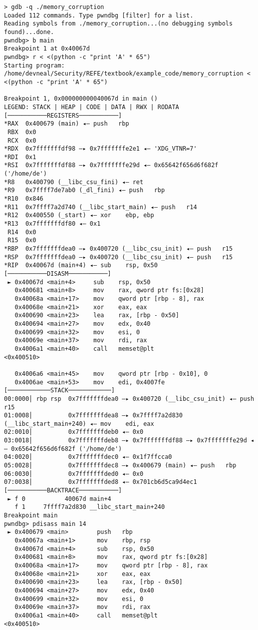 \documentclass{article}
\begin{document}
\begin{lstlisting}
> gdb -q ./memory_corruption
Loaded 112 commands. Type pwndbg [filter] for a list.
Reading symbols from ./memory_corruption...(no debugging symbols found)...done.
pwndbg> b main
Breakpoint 1 at 0x40067d
pwndbg> r < <(python -c "print 'A' * 65")
Starting program: /home/devneal/Security/REFE/textbook/example_code/memory_corruption < <(python -c "print 'A' * 65")

Breakpoint 1, 0x000000000040067d in main ()
LEGEND: STACK | HEAP | CODE | DATA | RWX | RODATA
[───────────REGISTERS───────────]
*RAX  0x400679 (main) ◂— push   rbp
 RBX  0x0
 RCX  0x0
*RDX  0x7fffffffdf98 —▸ 0x7fffffffe2e1 ◂— 'XDG_VTNR=7'
*RDI  0x1
*RSI  0x7fffffffdf88 —▸ 0x7fffffffe29d ◂— 0x65642f656d6f682f ('/home/de')
*R8   0x400790 (__libc_csu_fini) ◂— ret    
*R9   0x7ffff7de7ab0 (_dl_fini) ◂— push   rbp
*R10  0x846
*R11  0x7ffff7a2d740 (__libc_start_main) ◂— push   r14
*R12  0x400550 (_start) ◂— xor    ebp, ebp
*R13  0x7fffffffdf80 ◂— 0x1
 R14  0x0
 R15  0x0
*RBP  0x7fffffffdea0 —▸ 0x400720 (__libc_csu_init) ◂— push   r15
*RSP  0x7fffffffdea0 —▸ 0x400720 (__libc_csu_init) ◂— push   r15
*RIP  0x40067d (main+4) ◂— sub    rsp, 0x50
[───────────DISASM───────────]
 ► 0x40067d <main+4>     sub    rsp, 0x50
   0x400681 <main+8>     mov    rax, qword ptr fs:[0x28]
   0x40068a <main+17>    mov    qword ptr [rbp - 8], rax
   0x40068e <main+21>    xor    eax, eax
   0x400690 <main+23>    lea    rax, [rbp - 0x50]
   0x400694 <main+27>    mov    edx, 0x40
   0x400699 <main+32>    mov    esi, 0
   0x40069e <main+37>    mov    rdi, rax
   0x4006a1 <main+40>    call   memset@plt                    <0x400510>
 
   0x4006a6 <main+45>    mov    qword ptr [rbp - 0x10], 0
   0x4006ae <main+53>    mov    edi, 0x4007fe
[────────────STACK────────────]
00:0000│ rbp rsp  0x7fffffffdea0 —▸ 0x400720 (__libc_csu_init) ◂— push   r15
01:0008│          0x7fffffffdea8 —▸ 0x7ffff7a2d830 (__libc_start_main+240) ◂— mov    edi, eax
02:0010│          0x7fffffffdeb0 ◂— 0x0
03:0018│          0x7fffffffdeb8 —▸ 0x7fffffffdf88 —▸ 0x7fffffffe29d ◂— 0x65642f656d6f682f ('/home/de')
04:0020│          0x7fffffffdec0 ◂— 0x1f7ffcca0
05:0028│          0x7fffffffdec8 —▸ 0x400679 (main) ◂— push   rbp
06:0030│          0x7fffffffded0 ◂— 0x0
07:0038│          0x7fffffffded8 ◂— 0x701cb6d5ca9d4ec1
[───────────BACKTRACE───────────]
 ► f 0           40067d main+4
   f 1     7ffff7a2d830 __libc_start_main+240
Breakpoint main
pwndbg> pdisass main 14
 ► 0x400679 <main>        push   rbp
   0x40067a <main+1>      mov    rbp, rsp
   0x40067d <main+4>      sub    rsp, 0x50
   0x400681 <main+8>      mov    rax, qword ptr fs:[0x28]
   0x40068a <main+17>     mov    qword ptr [rbp - 8], rax
   0x40068e <main+21>     xor    eax, eax
   0x400690 <main+23>     lea    rax, [rbp - 0x50]
   0x400694 <main+27>     mov    edx, 0x40
   0x400699 <main+32>     mov    esi, 0
   0x40069e <main+37>     mov    rdi, rax
   0x4006a1 <main+40>     call   memset@plt                    <0x400510>
 

\end{lstlisting}
\end{document}
